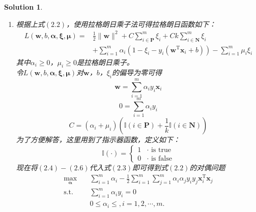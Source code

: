 \documentclass[a4paper,UTF8]{article}
\numberwithin{equation}{section}
\newtheorem*{mySol}{Solution}
\begin{document}
\begin{mySol}
\begin{enumerate}[(1)]
\item 
根据上式$(2.2)$，使用拉格朗日乘子法可得拉格朗日函数如下：
\begin{equation}
\begin{aligned}
L(\mathbf{w},b,\boldsymbol{\alpha},\boldsymbol{\xi},\boldsymbol{\mu}) =& \frac{1}{2} \lVert \mathbf{w} \rVert^2 + C\sum_{i \in \mathbf{P}}^m\xi_i + Ck\sum_{i \in \mathbf{N}}^m\xi_i\\
& + \sum_{i=1}^{m}\alpha_i(1-\xi_i-y_i(\mathbf{w}^\mathrm{T}\mathbf{x}_i + b)) - \sum_{i=1}^{m}\mu_i\xi_i 
\end{aligned}
\end{equation}
其中$\alpha_i \geq 0$，$\mu_i \geq 0$是拉格朗日乘子。\\
令$L(\mathbf{w},b,\boldsymbol{\alpha},\boldsymbol{\xi},\boldsymbol{\mu})$对$\mathbf{w}$，$b$，$\xi_i$的偏导为零可得
\begin{equation}
	\mathbf{w} = \sum_{i=1}^{m}\alpha_iy_i\mathbf{x}_i
\end{equation}
\begin{equation}
	0=\sum_{i=1}^{m}\alpha_iy_i
\end{equation}
\begin{equation}
	C = (\alpha_i + \mu_i)(\mathbb{I}(i\in \mathbf{P}) + \frac{1}{k}\mathbb{I}(i\in \mathbf{N}) )
\end{equation}
为了方便解答，这里用到了指示器函数，定义如下：
\begin{equation}
\mathbb{I}(\cdot) = 
\begin{cases}
1 & \mbox{$\cdot$ is true}\\
0 & \mbox{$\cdot$ is false}
\end{cases}
\end{equation}
现在将$(2.4)-(2.6)$代入式$(2.3)$即可得到式$(2.2)$的对偶问题
\begin{equation}
\begin{split}
\max_{\mathbf{\alpha}}& \quad \sum_{i=1}^{m}\alpha_i-\frac{1}{2}\sum_{i=1}^{m}\sum_{j=1}^{m}\alpha_i\alpha_jy_iy_j\mathbf{x}_i^\mathrm{T}\mathbf{x}_j\\
\text{s.t.}&  \quad \sum_{i=1}^{m}\alpha_iy_i = 0\\
& \quad 0 \leq \alpha_i \leq , i = 1,2,\cdots,m.
\end{split}	
\end{equation}
\end{enumerate}
\end{mySol}
\newpage
\end{document}
